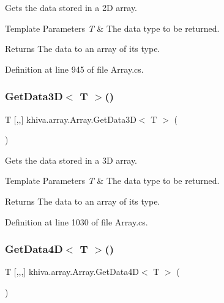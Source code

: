 Gets the data stored in a 2D array. 


\begin{DoxyTemplParams}{Template Parameters}
{\em T} & The data type to be returned.\\
\hline
\end{DoxyTemplParams}
\begin{DoxyReturn}{Returns}
The data to an array of its type.
\end{DoxyReturn}


Definition at line 945 of file Array.\+cs.

\mbox{\label{classkhiva_1_1array_1_1_array_a3996ff16f532b05862169501f3afeda1}} 
\subsubsection{\texorpdfstring{Get\+Data3\+D$<$ T $>$()}{GetData3D< T >()}}
{\footnotesize\ttfamily T \mbox{[},,\mbox{]} khiva.\+array.\+Array.\+Get\+Data3D$<$ T $>$ (\begin{DoxyParamCaption}{ }\end{DoxyParamCaption})\hspace{0.3cm}{\ttfamily [inline]}}



Gets the data stored in a 3D array. 


\begin{DoxyTemplParams}{Template Parameters}
{\em T} & The data type to be returned.\\
\hline
\end{DoxyTemplParams}
\begin{DoxyReturn}{Returns}
The data to an array of its type.
\end{DoxyReturn}


Definition at line 1030 of file Array.\+cs.

\mbox{\label{classkhiva_1_1array_1_1_array_a2ce7b4495a9be089d5747530b83eccbd}} 
\subsubsection{\texorpdfstring{Get\+Data4\+D$<$ T $>$()}{GetData4D< T >()}}
{\footnotesize\ttfamily T \mbox{[},,,\mbox{]} khiva.\+array.\+Array.\+Get\+Data4D$<$ T $>$ (\begin{DoxyParamCaption}{ }\end{DoxyParamCaption})\hspace{0.3cm}{\ttfamily [inline]}}



